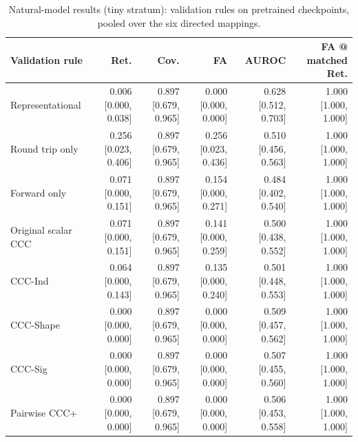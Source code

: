 \begin{table}[t]
\centering
\small
\begin{tabular}{lrrrrr}
\toprule
Validation rule & Ret. & Cov. & FA & AUROC & FA @ matched Ret. \\
\midrule
Representational & 0.006 [0.000, 0.038] & 0.897 [0.679, 0.965] & 0.000 [0.000, 0.000] & 0.628 [0.512, 0.703] & 1.000 [1.000, 1.000] \\
Round trip only & 0.256 [0.023, 0.406] & 0.897 [0.679, 0.965] & 0.256 [0.023, 0.436] & 0.510 [0.456, 0.563] & 1.000 [1.000, 1.000] \\
Forward only & 0.071 [0.000, 0.151] & 0.897 [0.679, 0.965] & 0.154 [0.000, 0.271] & 0.484 [0.402, 0.540] & 1.000 [1.000, 1.000] \\
Original scalar CCC & 0.071 [0.000, 0.151] & 0.897 [0.679, 0.965] & 0.141 [0.000, 0.259] & 0.500 [0.438, 0.552] & 1.000 [1.000, 1.000] \\
CCC-Ind & 0.064 [0.000, 0.143] & 0.897 [0.679, 0.965] & 0.135 [0.000, 0.240] & 0.501 [0.448, 0.553] & 1.000 [1.000, 1.000] \\
CCC-Shape & 0.000 [0.000, 0.000] & 0.897 [0.679, 0.965] & 0.000 [0.000, 0.000] & 0.509 [0.457, 0.562] & 1.000 [1.000, 1.000] \\
CCC-Sig & 0.000 [0.000, 0.000] & 0.897 [0.679, 0.965] & 0.000 [0.000, 0.000] & 0.507 [0.455, 0.560] & 1.000 [1.000, 1.000] \\
Pairwise CCC+ & 0.000 [0.000, 0.000] & 0.897 [0.679, 0.965] & 0.000 [0.000, 0.000] & 0.506 [0.453, 0.558] & 1.000 [1.000, 1.000] \\
\bottomrule
\end{tabular}
\caption{Natural-model results (tiny stratum): validation rules on pretrained checkpoints, pooled over the six directed mappings.}
\label{tab:table_5_1_natural_tiny}
\end{table}